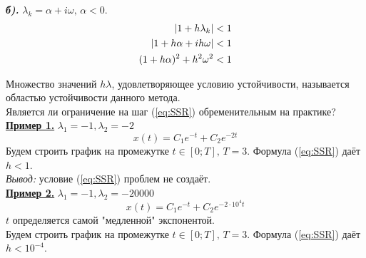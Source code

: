 \documentclass[a4paper,11pt]{article}
\begin{document}
\textbf{\textit{б).}} $\lambda_k = \alpha + i\omega,\, \alpha < 0$.
\begin{align}
    |1 + h\lambda_k|              &< 1 \notag \\
    |1 + h\alpha + ih\omega|      &< 1 \notag \\
    (1 + h\alpha)^2 + h^2\omega^2 &< 1
\end{align}
\begin{center}
\end{center}
Множество значений $h\lambda$, удовлетворяющее условию устойчивости, называется областью устойчивости данного метода. \\
Является ли ограничение на шаг (\ref{eq:SSR}) обременительным на практике? \\
\marginpar {
  \footnotesize \[e^{-3} < 0.05\] \[e^{-5} < 0.01\]
}
\textbf{\underline{Пример 1.}} $\lambda_1 = -1, \lambda_2 = -2$
\[x(t) = C_1e^{-t} + C_2e^{-2t}\]
Будем строить график на промежутке $t \in [0; T],\, T = 3$. Формула (\ref{eq:SSR}) даёт $h < 1$.
 \\
\textit{Вывод:} условие (\ref{eq:SSR}) проблем не создаёт. \\
\textbf{\underline{Пример 2.}} $\lambda_1 = -1, \lambda_2 = -20000$
\[x(t) = C_1e^{-t} + C_2e^{-2\cdot 10^4t}\]
$t$ определяется самой "медленной" экспонентой. \\
Будем строить график на промежутке $t \in [0; T],\, T = 3$. Формула (\ref{eq:SSR}) даёт $h < 10^{-4}$. \\
\end{document}
